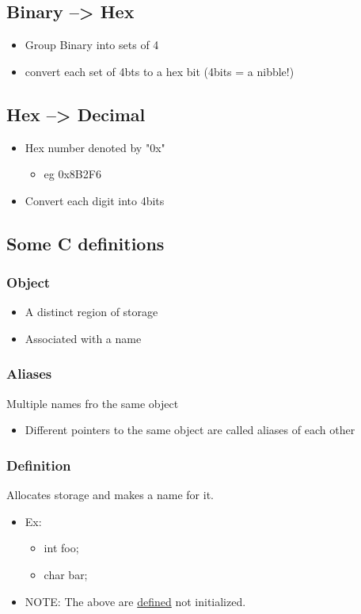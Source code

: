 \documentclass[11pt]{article}
\begin{document}
\subsection{Binary --> Hex}
\label{sec-2-4}
\begin{itemize}
\item Group Binary into sets of 4
\item convert each set of 4bts to a hex bit (4bits = a nibble!)
\end{itemize}

\subsection{Hex --> Decimal}
\label{sec-2-5}
\begin{itemize}
\item Hex number denoted by "0x"
\begin{itemize}
\item eg 0x8B2F6
\end{itemize}
\item Convert each digit into 4bits
\end{itemize}

\subsection{Some C definitions}
\label{sec-2-6}
\subsubsection{\textbf{Object}}
\label{sec-2-6-1}
\begin{itemize}
\item A distinct region of storage
\item Associated with a name
\end{itemize}
\subsubsection{\textbf{Aliases}}
\label{sec-2-6-2}
Multiple names fro the same object
\begin{itemize}
\item Different pointers to the same object are called aliases of each other
\end{itemize}
\subsubsection{\textbf{Definition}}
\label{sec-2-6-3}
Allocates storage and makes a name for it.
\begin{itemize}
\item Ex:
\begin{itemize}
\item int foo;
\item char bar;
\end{itemize}
\item NOTE: The above are \uline{defined} not initialized.
\end{itemize}
\end{document}
